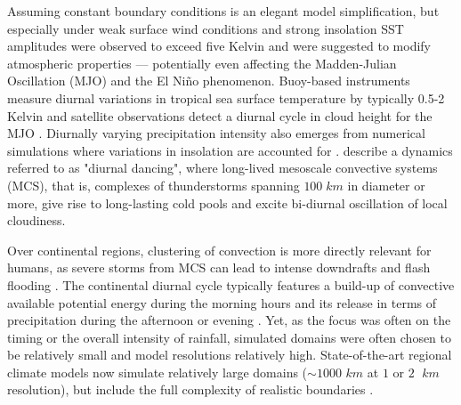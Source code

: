 \documentclass[draft,linenumbers]{agujournal2019}
\begin{document}
Assuming constant boundary conditions is an elegant model simplification, but especially under weak surface wind conditions and strong insolation SST amplitudes were observed to exceed five Kelvin and were suggested to modify atmospheric properties \cite{kawai2007diurnal} --- potentially even affecting the Madden-Julian Oscillation (MJO) and the El Ni\~no phenomenon.
Buoy-based instruments measure diurnal variations in tropical sea surface temperature by typically 0.5-2 Kelvin \cite{weller1996surface,johnson1999trimodal} and satellite observations detect a diurnal cycle in cloud height for the MJO \cite{suzuki2009diurnal,tian2006modulation}.
Diurnally varying precipitation intensity also emerges from numerical simulations where variations in insolation are accounted for \cite{liu1998numerical}. 
\cite{chen1997diurnal} describe a dynamics referred to as "diurnal dancing", where long-lived mesoscale convective systems (MCS), that is, complexes of thunderstorms spanning $100\;km$ in diameter or more, give rise to long-lasting cold pools \cite{moeng1995atmospheric} and excite bi-diurnal oscillation of local cloudiness.

Over continental regions, clustering of convection is more directly relevant for humans, as severe storms from MCS can lead to intense downdrafts and flash flooding
\cite{doswell2001severe,smith2001extreme,cintineo2013predictability}.
The continental diurnal cycle typically features a build-up of convective available potential energy during the morning hours and its release in terms of precipitation during the afternoon or evening \cite{yang2001diurnal,guichard2004modelling,brown2002large,petch2002impact,schlemmer2011diurnal,moseley2016intensification,haerter2018intensified}.
Yet, as the focus was often on the timing or the overall intensity of rainfall, simulated domains were often chosen to be relatively small and model resolutions relatively high. 
State-of-the-art regional climate models now simulate relatively large domains ($\sim 1000$ $km$ at $1$ or $2$ $\;km$ resolution), but include the full complexity of realistic boundaries \cite{ban2015heavy,prein2017simulating,rasp2018variability}.
\end{document}
